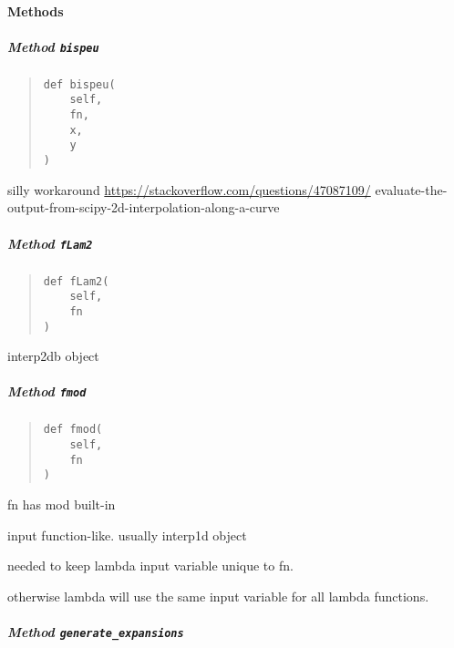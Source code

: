 \documentclass[english,a4paper,oneside]{article}
\let\oldparagraph\paragraph
\renewcommand{\paragraph}[1]{\oldparagraph{#1}\mbox{}}
\let\oldsubparagraph\subparagraph
\renewcommand{\subparagraph}[1]{\oldsubparagraph{#1}\mbox{}}
\begin{document}
\hypertarget{methods}{%
\paragraph{Methods}\label{methods}}

\hypertarget{StrongCoupling.StrongCoupling.bispeu}{%
\subparagraph{\texorpdfstring{Method
\texttt{bispeu}}{Method bispeu}}\label{StrongCoupling.StrongCoupling.bispeu}}

\begin{quote}
\begin{verbatim}
def bispeu(
    self,
    fn,
    x,
    y
)
\end{verbatim}
\end{quote}

silly workaround \url{https://stackoverflow.com/questions/47087109/}
evaluate-the-output-from-scipy-2d-interpolation-along-a-curve

\hypertarget{StrongCoupling.StrongCoupling.fLam2}{%
\subparagraph{\texorpdfstring{Method
\texttt{fLam2}}{Method fLam2}}\label{StrongCoupling.StrongCoupling.fLam2}}

\begin{quote}
\begin{verbatim}
def fLam2(
    self,
    fn
)
\end{verbatim}
\end{quote}

interp2db object

\hypertarget{StrongCoupling.StrongCoupling.fmod}{%
\subparagraph{\texorpdfstring{Method
\texttt{fmod}}{Method fmod}}\label{StrongCoupling.StrongCoupling.fmod}}

\begin{quote}
\begin{verbatim}
def fmod(
    self,
    fn
)
\end{verbatim}
\end{quote}

fn has mod built-in

input function-like. usually interp1d object

needed to keep lambda input variable unique to fn.

otherwise lambda will use the same input variable for all lambda
functions.

\hypertarget{StrongCoupling.StrongCoupling.generate_expansions}{%
\subparagraph{\texorpdfstring{Method
\texttt{generate\_expansions}}{Method generate\_expansions}}\label{StrongCoupling.StrongCoupling.generate_expansions}}
\end{document}
